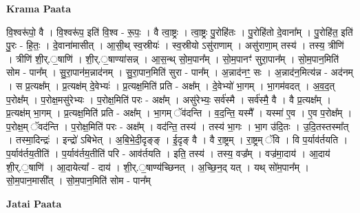 \documentclass[17pt]{extarticle}
\begin{document}
\textbf{Krama Paata} \newline

वि॒श्वरू॑पो॒ वै । वि॒श्वरू॑प॒ इति॑ वि॒श्व - रू॒पः॒ । वै त्वा॒ष्ट्रः । त्वा॒ष्ट्रः पु॒रोहि॑तः । पु॒रोहि॑तो दे॒वाना᳚म् । पु॒रोहि॑त॒ इति॑ पु॒रः - हि॒तः॒ । दे॒वाना॑मासीत् । आ॒सी॒थ् स्व॒स्रीयः॑ । स्व॒स्रीयो ऽसु॑राणाम् । असु॑राणा॒म् तस्य॑ । तस्य॒ त्रीणि॑ । त्रीणि॑ शी॒र्.॒षाणि॑ । शी॒र्.॒षाण्या॑सन्न् । आ॒स॒न्थ् सो॒म॒पान᳚म् । सो॒म॒पानꣳ॑ सुरा॒पान᳚म् । सो॒म॒पान॒मिति॑ सोम - पान᳚म् । सु॒रा॒पान॑म॒न्नाद॑नम् । सु॒रा॒पान॒मिति॑ सुरा - पान᳚म् । अ॒न्नाद॑नꣳ॒॒ सः । अ॒न्नाद॑न॒मित्य॑न्न - अद॑नम् । स प्र॒त्यक्ष᳚म् । प्र॒त्यक्ष॑म् दे॒वेभ्यः॑ । प्र॒त्यक्ष॒मिति॑ प्रति - अक्ष᳚म् । दे॒वेभ्यो॑ भा॒गम् । भा॒गम॑वदत् । अ॒व॒द॒त् प॒रोक्ष᳚म् । प॒रोक्ष॒मसु॑रेभ्यः । प॒रोक्ष॒मिति॑ परः - अक्ष᳚म् । असु॑रेभ्यः॒ सर्व॑स्मै । सर्व॑स्मै॒ वै । वै प्र॒त्यक्ष᳚म् । प्र॒त्यक्ष॑म् भा॒गम् । प्र॒त्यक्ष॒मिति॑ प्रति - अक्ष᳚म् । भा॒गम् ॅव॑दन्ति । व॒द॒न्ति॒ यस्मै᳚ । यस्मा॑ ए॒व । ए॒व प॒रोक्ष᳚म् । प॒रोक्ष॒म् ॅवद॑न्ति । प॒रोक्ष॒मिति॑ परः - अक्ष᳚म् । वद॑न्ति॒ तस्य॑ । तस्य॑ भा॒गः । भा॒ग उ॑दि॒तः । उ॒दि॒तस्तस्मा᳚त् । तस्मा॒दिन्द्रः॑ । इन्द्रो॑ ऽबिभेत् । अ॒बि॒भे॒दी॒दृङ्ङ् । ई॒दृङ् वै । वै रा॒ष्ट्रम् । रा॒ष्ट्रम् ॅवि । वि प॒र्याव॑र्तयति । प॒र्याव॑र्तय॒तीति॑ । प॒र्याव॑र्तय॒तीति॑ परि - आव॑र्तयति । इति॒ तस्य॑ । तस्य॒ वज्र᳚म् । वज्र॑मा॒दाय॑ । आ॒दाय॑ शी॒र्.॒षाणि॑ । आ॒दायेत्या᳚ - दाय॑ । शी॒र्.॒षाण्य॑च्छिनत् । अ॒च्छि॒न॒द् यत् । यथ् सो॑म॒पान᳚म् । सो॒म॒पान॒मासी᳚त् । सो॒म॒पान॒मिति॑ सोम - पान᳚म् \newline

\textbf{Jatai Paata} \newline
\end{document}
